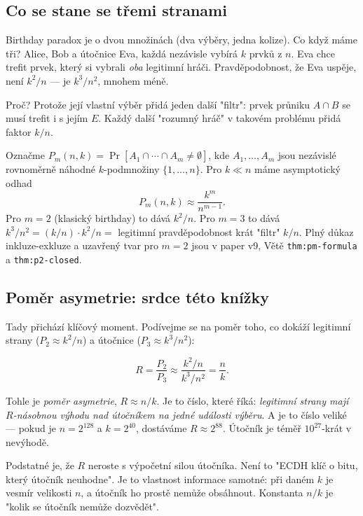 \documentclass[11pt,a4paper]{article}
\begin{document}
\subsection{Co se stane se třemi stranami}

Birthday paradox je o dvou množinách (dva výběry, jedna kolize). Co když máme tři? Alice, Bob a útočnice Eva, každá nezávisle vybírá $k$ prvků z $n$. Eva chce trefit prvek, který si vybrali \emph{oba} legitimní hráči. Pravděpodobnost, že Eva uspěje, není $k^2/n$ --- je $k^3 / n^2$, mnohem méně.

Proč? Protože její vlastní výběr přidá jeden další "filtr": prvek průniku $A \cap B$ se musí trefit i s jejím $E$. Každý další "rozumný hráč" v takovém problému přidá faktor $k/n$.

\begin{sidebar}
Označme $P_m(n, k) = \Pr[A_1 \cap \cdots \cap A_m \neq \emptyset]$, kde $A_1, \ldots, A_m$ jsou nezávislé rovnoměrně náhodné $k$-podmnožiny $\{1, \ldots, n\}$. Pro $k \ll n$ máme asymptotický odhad
\[
P_m(n, k) \approx \frac{k^m}{n^{m-1}}.
\]
Pro $m = 2$ (klasický birthday) to dává $k^2/n$. Pro $m = 3$ to dává $k^3/n^2 = (k/n) \cdot k^2/n = $ legitimní pravděpodobnost krát "filtr" $k/n$. Plný důkaz inkluze-exkluze a uzavřený tvar pro $m=2$ jsou v paper v9, Větě \texttt{thm:pm-formula} a \texttt{thm:p2-closed}.
\end{sidebar}

\subsection{Poměr asymetrie: srdce této knížky}

Tady přichází klíčový moment. Podívejme se na poměr toho, co dokáží legitimní strany ($P_2 \approx k^2/n$) a útočnice ($P_3 \approx k^3/n^2$):

\[
R = \frac{P_2}{P_3} \approx \frac{k^2 / n}{k^3 / n^2} = \frac{n}{k}.
\]

Tohle je \emph{poměr asymetrie}, $R \approx n/k$. Je to číslo, které říká: \emph{legitimní strany mají $R$-násobnou výhodu nad útočníkem na jedné události výběru}. A je to číslo veliké --- pokud je $n = 2^{128}$ a $k = 2^{40}$, dostáváme $R \approx 2^{88}$. Útočník je téměř $10^{27}$-krát v nevýhodě.

\begin{aha}
Podstatné je, že $R$ neroste s výpočetní silou útočníka. Není to "ECDH klíč o bitu, který útočník neuhodne". Je to vlastnost informace samotné: při daném $k$ je vesmír velikosti $n$, a útočník ho prostě nemůže obsáhnout. Konstanta $n/k$ je "kolik se útočník nemůže dozvědět".
\end{aha}
\end{document}
